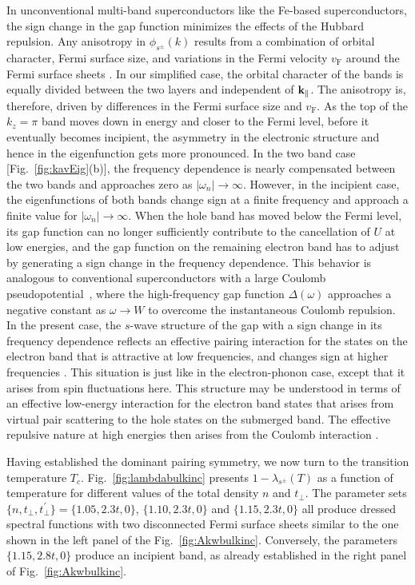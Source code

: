 \documentclass[prb,twocolumn,amsmath,amssymb,superscriptaddress,floatfix,nofootinbib]{revtex4-2}
\begin{document}
In unconventional multi-band superconductors like the Fe-based superconductors, the sign change in the gap function minimizes the effects of the Hubbard repulsion. Any anisotropy in 
$\phi_{s^\pm}(k)$ results from a combination of orbital character, Fermi surface size, and variations in the Fermi velocity $v_\mathrm{F}$ around the Fermi surface sheets \cite{MaierPRB2009, ZhangPRB2009}. In our simplified case, the orbital character of the bands is equally divided between the two layers and independent of ${\bf k}_\parallel$. The anisotropy is, therefore, driven by differences in the Fermi surface size and $v_\mathrm{F}$. As the top of the $k_z=\pi$ band moves down in energy and closer to the Fermi level, before it eventually becomes incipient, the asymmetry in the electronic structure and hence in the eigenfunction gets more pronounced. In the two band case [Fig.~\ref{fig:kavEig}(b)], the frequency dependence is nearly compensated between the two bands and approaches zero as $|\omega_n|\rightarrow\infty$. However, in the incipient case, the eigenfunctions of both bands change sign at a finite frequency and approach a finite value for $|\omega_n|\rightarrow\infty$. When the hole band has moved below the Fermi level, its gap function can no longer sufficiently contribute to the cancellation of $U$ at low energies, and the gap function on the remaining electron band has to adjust by generating a sign change in the frequency dependence. This behavior is analogous to conventional superconductors with a large Coulomb pseudopotential~\cite{PhysRevLett.100.237001}, where the high-frequency gap function $\Delta(\omega)$ approaches a negative constant as $\omega\rightarrow W$ to overcome the instantaneous Coulomb repulsion. In the present case, the $s$-wave structure of the gap with a sign change in its frequency dependence reflects an effective pairing interaction for the states on the electron band that is attractive at low frequencies, and changes sign at higher frequencies \cite{Maier2019}. This situation is just like in the electron-phonon case, except that it arises from spin fluctuations here. This structure may be understood in terms of an effective low-energy interaction for the electron band states that arises from virtual pair scattering to the hole states on the submerged band. The effective repulsive nature at high energies then arises from the Coulomb interaction \cite{Maier2019}.

Having established the dominant pairing symmetry, we now turn to the transition temperature $T_c$. Fig.~\ref{fig:lambdabulkinc} presents $1-\lambda_{s^\pm}(T)$ as a function of temperature for different values of the total density $n$ and $t_\perp$. The parameter sets $\{n, t^{\phantom\prime}_\perp, t^\prime_\perp\} = \{1.05, 2.3t, 0\}$, $\{1.10, 2.3t, 0\}$ and $\{1.15, 2.3t, 0\}$ all produce dressed spectral functions with two disconnected Fermi surface sheets similar to the one shown in the left panel of the Fig.~\ref{fig:Akwbulkinc}. Conversely, the parameters $\{1.15, 2.8t, 0\}$ produce an incipient band, as already established in the right panel of Fig.~\ref{fig:Akwbulkinc}. 
\end{document}
